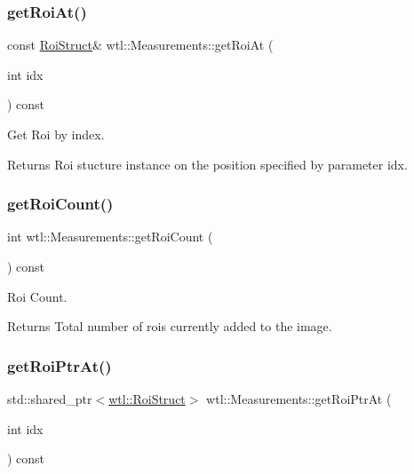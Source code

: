 \subsubsection{\texorpdfstring{get\+Roi\+At()}{getRoiAt()}}
{\footnotesize\ttfamily const \hyperlink{structwtl_1_1_roi_struct}{Roi\+Struct}\& wtl\+::\+Measurements\+::get\+Roi\+At (\begin{DoxyParamCaption}\item[{int}]{idx }\end{DoxyParamCaption}) const}



Get Roi by index. 

\begin{DoxyReturn}{Returns}
Roi stucture instance on the position specified by parameter idx. 
\end{DoxyReturn}
\mbox{\label{classwtl_1_1_measurements_a5f5e6c3dfecd34dbb6aad44f64abf2af}} 
\subsubsection{\texorpdfstring{get\+Roi\+Count()}{getRoiCount()}}
{\footnotesize\ttfamily int wtl\+::\+Measurements\+::get\+Roi\+Count (\begin{DoxyParamCaption}{ }\end{DoxyParamCaption}) const}



Roi Count. 

\begin{DoxyReturn}{Returns}
Total number of rois currently added to the image. 
\end{DoxyReturn}
\mbox{\label{classwtl_1_1_measurements_ae12d47e8833b6d390d35473ade7be332}} 
\subsubsection{\texorpdfstring{get\+Roi\+Ptr\+At()}{getRoiPtrAt()}}
{\footnotesize\ttfamily std\+::shared\+\_\+ptr$<$\hyperlink{structwtl_1_1_roi_struct}{wtl\+::\+Roi\+Struct}$>$ wtl\+::\+Measurements\+::get\+Roi\+Ptr\+At (\begin{DoxyParamCaption}\item[{int}]{idx }\end{DoxyParamCaption}) const}



